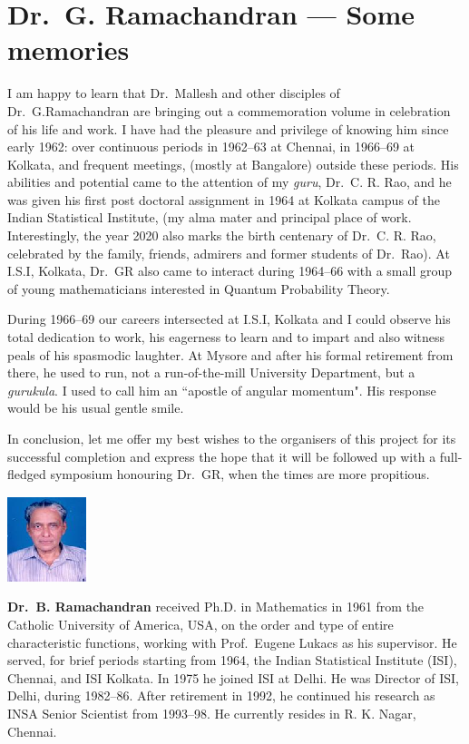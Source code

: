 \chapter{Dr.\ G. Ramachandran --- Some memories}\label{chap10}



I am happy to learn that Dr.\ Mallesh and other disciples of Dr.\ G.\break Ramachandran are bringing out a commemoration volume in celebration of his life
and work. I have had the pleasure and privilege of knowing him since early
1962: over continuous periods in 1962--63 at Chennai, in 1966--69 at Kolkata,
and frequent meetings, (mostly at Bangalore) outside these periods. His abilities and potential came 
to the attention of my \textit{guru}, Dr.\ C. R. Rao, and he was
given his first post doctoral assignment in 1964 at Kolkata campus of the Indian
Statistical Institute, (my alma mater and principal place of work. Interestingly,
the year 2020 also marks the birth centenary of Dr.\ C. R. Rao, celebrated by
the family, friends, admirers and former students of Dr.\ Rao). At I.S.I, Kolkata,
Dr.\ GR also came to interact during 1964--66 with a small group of young
mathematicians interested in Quantum Probability Theory.

During 1966--69 our careers intersected at I.S.I, Kolkata and I could observe
his total dedication to work, his eagerness to learn and to impart and also 
witness peals of his spasmodic laughter. At Mysore and after his formal retirement
from there, he used to run, not a run-of-the-mill University Department, but a
\textit{gurukula}. I used to call him an ``apostle of angular momentum". His response
would be his usual gentle smile.


In conclusion, let me offer my best wishes to the organisers of this project
for its successful completion and express the hope that it will be followed up
with a full-fledged symposium honouring Dr.\ GR, when the times are more
propitious.
\newpage

\centerline{\includegraphics[scale=4]{authorsphotos/Prof_B_Ramachandran.eps}}
\bigskip

\noindent
\textbf{Dr.\ B. Ramachandran} received Ph.D. in Mathematics in 1961 from the Catholic University of America, 
USA, on the order and type of entire characteristic functions, working with 
Prof.\ Eugene Lukacs as his supervisor. He served, for brief periods starting from 1964, the Indian 
Statistical Institute (ISI), Chennai, and ISI Kolkata. In 1975 he joined ISI at Delhi. He was Director of 
ISI, Delhi, during 1982--86. After retirement in 1992, he continued his research as INSA Senior Scientist 
from 1993--98. He currently resides in R. K. Nagar, Chennai.
